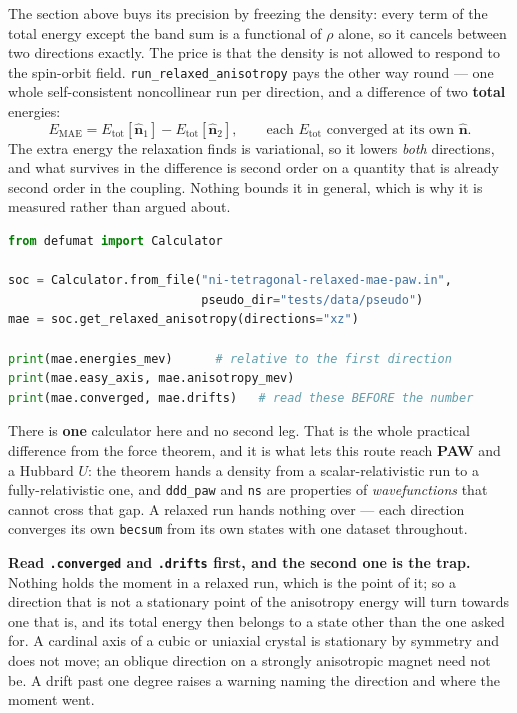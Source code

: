 \documentclass[11pt,a4paper]{article}
\newcommand{\code}[1]{\texttt{\small #1}}
\begin{document}
The section above buys its precision by freezing the density: every term of the
total energy except the band sum is a functional of $\rho$ alone, so it cancels
between two directions exactly. The price is that the density is not allowed to
respond to the spin-orbit field. \code{run\_relaxed\_anisotropy} pays the other
way round --- one whole self-consistent noncollinear run per direction, and a
difference of two \textbf{total} energies:
%
\[
  E_{\mathrm{MAE}} = E_{\mathrm{tot}}[\hat{\mathbf n}_1] - E_{\mathrm{tot}}[\hat{\mathbf n}_2],
  \qquad \text{each } E_{\mathrm{tot}} \text{ converged at its own } \hat{\mathbf n}.
\]
%
The extra energy the relaxation finds is variational, so it lowers \emph{both}
directions, and what survives in the difference is second order on a quantity
that is already second order in the coupling. Nothing bounds it in general,
which is why it is measured rather than argued about.

\begin{lstlisting}[language=Python]
from defumat import Calculator

soc = Calculator.from_file("ni-tetragonal-relaxed-mae-paw.in",
                           pseudo_dir="tests/data/pseudo")
mae = soc.get_relaxed_anisotropy(directions="xz")

print(mae.energies_mev)      # relative to the first direction
print(mae.easy_axis, mae.anisotropy_mev)
print(mae.converged, mae.drifts)   # read these BEFORE the number
\end{lstlisting}

There is \textbf{one} calculator here and no second leg. That is the whole
practical difference from the force theorem, and it is what lets this route
reach \textbf{PAW} and a Hubbard $U$: the theorem hands a density from a
scalar-relativistic run to a fully-relativistic one, and \code{ddd\_paw} and
\code{ns} are properties of \emph{wavefunctions} that cannot cross that gap. A
relaxed run hands nothing over --- each direction converges its own
\code{becsum} from its own states with one dataset throughout.

\textbf{Read \code{.converged} and \code{.drifts} first, and the second one is
the trap.} Nothing holds the moment in a relaxed run, which is the point of it;
so a direction that is not a stationary point of the anisotropy energy will turn
towards one that is, and its total energy then belongs to a state other than the
one asked for. A cardinal axis of a cubic or uniaxial crystal is stationary by
symmetry and does not move; an oblique direction on a strongly anisotropic
magnet need not be. A drift past one degree raises a warning naming the
direction and where the moment went.
\end{document}
